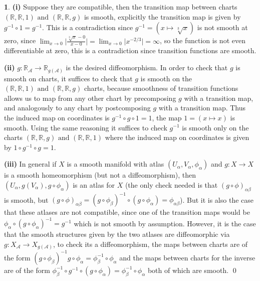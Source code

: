 \documentclass[10.5pt]{article}
\theoremstyle{definition}
\newtheorem{pb}{}
\newcommand{\abs}[1]{\lvert#1\rvert}
\newcommand{\tand}{\text{ and }}
\begin{document}
    \begin{pb}
        \textbf{(i)} Suppose they are compatible, then the transition map between charts \((\mathbb{R},\mathbb{R},1) \tand (\mathbb{R},\mathbb{R},g)\) is smooth, explicitly the transition map is given by \(g^{-1}\circ1 = g^{-1}\). This is a contradiction since \(g^{-1} = (x \mapsto \sqrt[3]{x})\) is not smooth at zero, since \(\lim_{x \to 0}\abs{\frac{\sqrt[3]{x} - 0}{x - 0}} = \lim_{x\to0}\abs{x^{-2/3}} = \infty\), so the function is not even differentiable at zero, this is a contradiction since transition functions are smooth.

        \textbf{(ii)} \(g: \mathbb{R}_\mathcal{A} \to \mathbb{R}_{g(\mathcal{A})}\) is the desired diffeomorphism. In order to check that \(g\) is smooth on charts, it suffices to check that \(g\) is smooth on the \((\mathbb{R},\mathbb{R},1) \tand (\mathbb{R},\mathbb{R},g)\) charts, because smoothness of transition functions allows us to map from any other chart by precomposing \(g\) with a transition map, and analogously to any chart by postcomposing \(g\) with a transition map. Thus the induced map on coordinates is \(g^{-1}\circ g\circ1 = 1\), the map \(1 = (x \mapsto x)\) is smooth. Using the same reasoning it suffices to check \(g^{-1}\) is smooth only on the charts \((\mathbb{R},\mathbb{R},g) \tand (\mathbb{R},\mathbb{R},1)\) where the induced map on coordinates is given by \(1\circ g^{-1}\circ g = 1\).

        \textbf{(iii)} In general if \(X\) is a smooth manifold with atlas \((U_\alpha,V_\alpha,\phi_\alpha)\) and \(g: X \to X\) is a smooth homeomorphism (but not a diffeomorphism), then \((U_\alpha,g(V_\alpha),g\circ\phi_\alpha)\) is an atlas for \(X\) (the only check needed is that \((g\circ\phi)_{\alpha \beta}\) is smooth, but \((g\circ\phi)_{\alpha \beta} = (g\circ\phi_\beta)^{-1}\circ(g\circ\phi_\alpha) = \phi_{\alpha \beta}\)). But it is also the case that these atlases are not compatible, since one of the transition maps would be \(\phi_\alpha\circ (g\circ\phi_\alpha)^{-1} = g^{-1}\) which is not smooth by assumption. However, it is the case that the smooth structures given by the two atlases are diffeomorphic via \(g: X_\mathcal{A} \to X_{g(\mathcal{A})}\), to check its a diffeomorphism, the maps between charts are of the form \((g\circ\phi_\beta)^{-1}g\circ\phi_\alpha = \phi_\beta^{-1}\circ\phi_\alpha\) and the maps between charts for the inverse are of the form \(\phi_\beta^{-1} \circ g^{-1}\circ(g\circ\phi_\alpha) = \phi_\beta^{-1}\circ\phi_\alpha\) both of which are smooth. \qed
    \end{pb}
\end{document}
